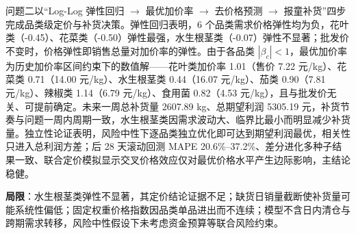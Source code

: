 问题二以“Log-Log 弹性回归 $\to$ 最优加价率 $\to$ 去价格预测 $\to$ 报童补货”四步完成品类级定价与补货决策。弹性回归表明，6 个品类需求价格弹性均为负，花叶类（-0.45）、花菜类（-0.50）弹性最强，水生根茎类（-0.07）弹性不显著；批发价不变时，价格弹性即销售总量对加价率的弹性。由于各品类 $|\beta_c|<1$，最优加价率为历史加价率区间约束下的数值解——花叶类加价率 1.01（售价 7.22 元/kg）、花菜类 0.71（14.00 元/kg）、水生根茎类 0.44（16.07 元/kg）、茄类 0.90（7.81 元/kg）、辣椒类 1.14（6.79 元/kg）、食用菌 0.82（4.53 元/kg），且与批发价无关、可提前确定。未来一周总补货量 2607.89 kg、总期望利润 5305.19 元，补货节奏与问题一周内周期一致，水生根茎类因需求波动大、临界比最小而明显减少补货量。独立性论证表明，风险中性下逐品类独立优化即可达到期望利润最优，相关性只进入总利润方差；后 28 天滚动回测 MAPE 20.6\%–37.2\%、差分进化多种子结果一致、联合定价模拟显示交叉价格效应仅对最优价格水平产生边际影响，主结论稳健。

\textbf{局限}：水生根茎类弹性不显著，其定价结论证据不足；缺货日销量截断使补货量可能系统性偏低；固定权重价格指数因品类单品进出而不连续；模型不含日内清仓与跨期需求转移，风险中性假设下未考虑资金预算等联合风险约束。
